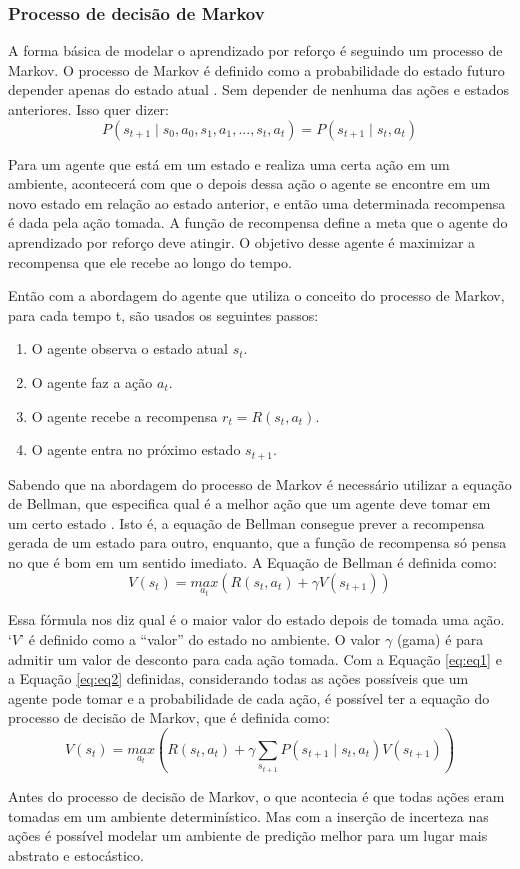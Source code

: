 \subsubsection{Processo de decisão de Markov}

A forma básica de modelar o aprendizado por reforço é seguindo um processo de Markov. O processo de Markov é definido como a probabilidade do estado futuro depender apenas do estado atual \cite{bellman1957markovian}. Sem depender de nenhuma das ações e estados anteriores. Isso quer dizer:
\begin{equation}
P(s_{t+1} \mid {s_0,a_0,s_1,a_1 , ... ,s_t,a_t}) = P( s_{t+1} \mid {s_t,a_t} )
\label{eq:eq1}
\end{equation}

Para um agente que está em um estado e realiza uma certa ação em um ambiente, acontecerá com que o depois dessa ação o agente se encontre em um novo estado em relação ao estado anterior, e então uma determinada recompensa é dada pela ação tomada. A função de recompensa define a meta que o agente do aprendizado por reforço deve atingir. O objetivo desse agente é maximizar a recompensa que ele recebe ao longo do tempo.

Então com a abordagem do agente que utiliza o conceito do processo de Markov, para cada tempo t, são usados os seguintes passos:
\begin{enumerate}
    \item O agente observa o estado atual $s_t$.
    \item O agente faz a ação $a_t$.
    \item O agente recebe a recompensa $r_t = R(s_t, a_t)$.
    \item O agente entra no próximo estado $s_{t+1}$.
\end{enumerate}

Sabendo que na abordagem do processo de Markov é necessário utilizar a equação de Bellman, que especifica qual é a melhor ação que um agente deve tomar em um certo estado \cite{bellman2015applied}. Isto é, a equação de Bellman consegue prever a recompensa gerada de um estado para outro, enquanto, que a função de recompensa só pensa no que é bom em um sentido imediato. A Equação de Bellman é definida como:
\begin{equation}
    V( s_{t} ) =  \underset{a_t}{max}(R(s_t,a_{t}) + \gamma V(s_{t+1}))
    \label{eq:eq2}
\end{equation}

Essa fórmula nos diz qual é o maior valor do estado depois de tomada uma ação.
`$V$' é definido como a “valor” do estado no ambiente.
O valor $\gamma$ (gama) é para admitir um valor de desconto para cada ação tomada. Com a Equação \ref{eq:eq1} e a Equação \ref{eq:eq2} definidas, considerando todas as ações possíveis que um agente pode tomar e a probabilidade de cada ação, é possível ter a equação do processo de decisão de Markov, que é definida como:
\begin{equation}
    V( s_{t} ) = \underset{a_t}{max}( R(s_t,a_{t}) + \gamma \sum_{s_{t+1}} P( s_{t+1} \mid {s_t,a_t} ) V(s_{t+1}) )
\end{equation}

Antes do processo de decisão de Markov, o que acontecia é que todas ações eram tomadas em um ambiente determinístico. Mas com a inserção de incerteza nas ações é possível modelar um ambiente de predição melhor para um lugar mais abstrato e estocástico.